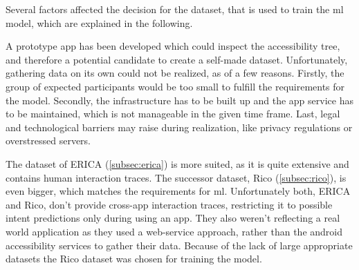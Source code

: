 


Several factors affected the decision for the dataset, that is used to train the \gls{ml} model, which are explained in the following.

A prototype app has been developed which could inspect the accessibility tree, and therefore a potential candidate to create a self-made dataset.
Unfortunately, gathering data on its own could not be realized, as of a few reasons.
Firstly, the group of expected participants would be too small to fulfill the requirements for the model.
Secondly, the infrastructure has to be built up and the app service has to be maintained, which is not manageable in the given time frame.
Last, legal and technological barriers may raise during realization, like privacy regulations or overstressed servers.

The dataset of ERICA (\ref{subsec:erica}) is more suited, as it is quite extensive and contains human interaction traces.
The successor dataset, Rico (\ref{subsec:rico}), is even bigger, which matches the requirements for \gls{ml}.
Unfortunately both, ERICA and Rico, don't provide cross-app interaction traces, restricting it to possible intent predictions only during using an app.
They also weren't reflecting a real world application as they used a web-service approach, rather than the android accessibility services to gather their data.
Because of the lack of large appropriate datasets the Rico dataset was chosen for training the model.


